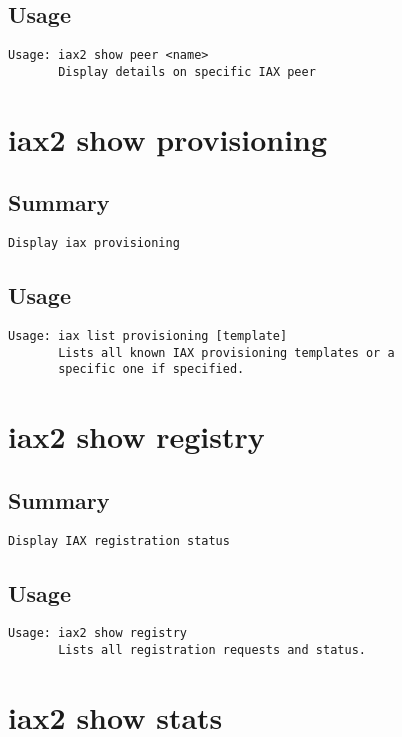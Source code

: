 \subsection{Usage}
\begin{verbatim}
Usage: iax2 show peer <name>
       Display details on specific IAX peer

\end{verbatim}


\section{iax2 show provisioning}
\subsection{Summary}
\begin{verbatim}
Display iax provisioning
\end{verbatim}
\subsection{Usage}
\begin{verbatim}
Usage: iax list provisioning [template]
       Lists all known IAX provisioning templates or a
       specific one if specified.

\end{verbatim}


\section{iax2 show registry}
\subsection{Summary}
\begin{verbatim}
Display IAX registration status
\end{verbatim}
\subsection{Usage}
\begin{verbatim}
Usage: iax2 show registry
       Lists all registration requests and status.

\end{verbatim}


\section{iax2 show stats}
